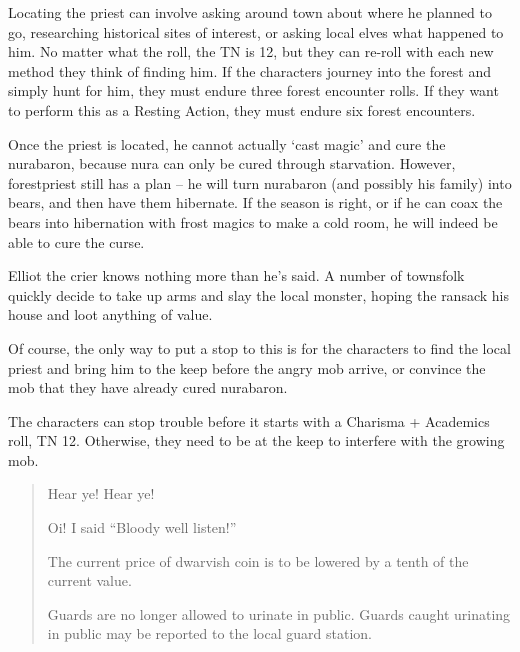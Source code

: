 \begin{multicols}{2}
Locating the priest can involve asking around town about where he planned to go, researching historical sites of interest, or asking local elves what happened to him.
No matter what the roll, the TN is 12, but they can re-roll with each new method they think of finding him.
If the characters journey into the forest and simply hunt for him, they must endure three forest encounter rolls.
If they want to perform this as a Resting Action, they must endure six forest encounters.

Once the priest is located, he cannot actually `cast magic' and cure the \gls{nurabaron}, because nura can only be cured through starvation.
However, \gls{forestpriest} still has a plan -- he will turn \gls{nurabaron} (and possibly his family) into bears, and then have them hibernate.
If the season is right, or if he can coax the bears into hibernation with frost magics to make a cold room, he will indeed be able to cure the curse.



Elliot the crier knows nothing more than he's said.  A number of townsfolk quickly decide to take up arms and slay the local monster, hoping the ransack his house and loot anything of value.

Of course, the only way to put a stop to this is for the characters to find the local priest and bring him to the keep before the angry mob arrive, or convince the mob that they have already cured \gls{nurabaron}.

The characters can stop trouble before it starts with a Charisma + Academics roll, TN 12.
Otherwise, they need to be at the keep to interfere with the growing mob.

\begin{boxtext}

	\begin{verse}

		Hear ye! Hear ye!

		Oi! I said ``Bloody well listen!''

		The current price of dwarvish coin is to be lowered by a tenth of the current value.

		Guards are no longer allowed to urinate in public.
		Guards caught urinating in public may be reported to the local guard station.


\end{verse}
\end{boxtext}
\end{multicols}
